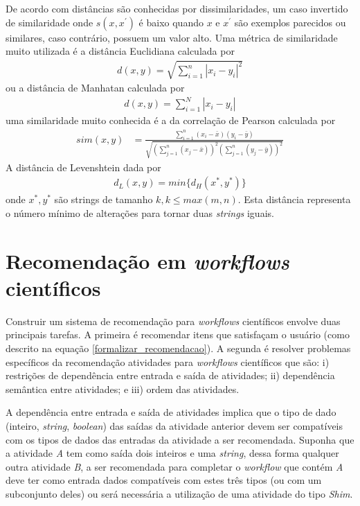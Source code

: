 De acordo com  distâncias são conhecidas por dissimilaridades, um caso invertido de similaridade onde \(s(x,x^{'})\) é baixo quando \(x\) e \(x^{'}\) são exemplos parecidos ou similares, caso contrário, possuem um valor alto. Uma métrica de similaridade muito utilizada é a distância Euclidiana \cite{Deza2009} calculada por
\begin{align}
d(x,y) = \sqrt{  \sum\limits_{i=1}^{n} |x_{i} - y_{i}|^{2} } \label{dist_euclidiana}
\end{align}
ou a distância de Manhatan \cite{Deza2009} calculada por
\begin{align}
d(x, y) = \sum\limits_{i=1}^{N} |x_{i} - y_{i}|\label{dist_manhattan}
\end{align}
uma similaridade muito conhecida é a da correlação de Pearson \cite{Deza2009} calculada por
\begin{align}
sim(x,y) &= \frac{\sum\limits_{i=1}^{n} (x_{i}-\bar{x})(y_{i} - \bar{y})}
{\sqrt{ \left( \sum\limits_{j=1}^{n}(x_{j}-\bar{x}) \right) ^{2} \left( \sum\limits_{j=1}^{n}(y_{j}-\bar{y})\right)^{2}} } \label{similaridade_pearson}
\end{align}
A distância de Levenshtein \cite{Deza2009} dada por
\begin{align}
d_{L}(x,y) = min\{d_{H}(x^{*}, y^{*})\} \label{dist_Levenshtein}
\end{align}
onde \(x^{*}, y^{*}\) são strings de tamanho \(k, k \leq max(m, n)\). Esta distância representa o número mínimo de alterações para tornar duas \emph{strings} iguais.

\section{Recomendação em \emph{workflows} científicos}\label{SEC_RECOMENDACAO_WORKFLOW_CIENTIFICO}
Construir um sistema de recomendação para \emph{workflows} científicos envolve duas principais tarefas. A primeira é recomendar itens que satisfaçam o usuário (como descrito na equação \eqref{formalizar_recomendacao}). A segunda é resolver problemas específicos da recomendação atividades para \emph{workflows} científicos que são: i) restrições de dependência entre entrada e saída de atividades; ii) dependência semântica entre atividades; e iii) ordem das atividades.

A dependência entre entrada e saída de atividades implica que o tipo de dado (inteiro, \emph{string}, \emph{boolean}) das saídas da atividade anterior devem ser compatíveis com os tipos de dados das entradas da atividade a ser recomendada. Suponha que a atividade \emph{A} tem como saída dois inteiros e uma \emph{string}, dessa forma qualquer outra atividade \emph{B}, a ser recomendada para completar o \emph{workflow} que contém \emph{A} deve ter como entrada dados compatíveis com estes três tipos (ou com um subconjunto deles) ou será necessária a utilização de uma atividade do tipo \emph{Shim}.


